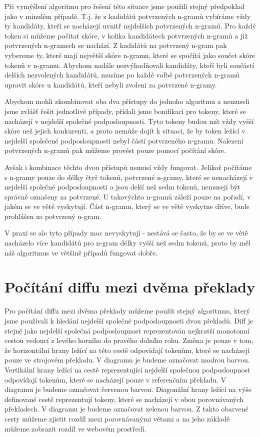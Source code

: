 Při vymýšlení algoritmu pro řešení této situace jsme použili stejný předpoklad jako v minulém případě.
T.j. že z kadidátů potvrzených n-gramů vybíráme vždy ty kandidáty,
  kteří se nacházejí uvnitř nejdelších potvrzených n-gramů.
Pro každý token si můžeme počítat skóre,
  v kolika kandidátech potvrzených n-gramů a již potvrzených n-gramech se nachází.
Z kadidátů na potvrzený n-gram pak vybereme ty,
  které mají největší skóre n-gramu,
  které se spočítá jako součet skóre tokenů v n-gramu.
Abychom nadále nezvýhodňovali kandidáty,
  kteří byli součástí delších nezvolených kandidátů,
  musíme po každé volbě potvrzených n-gramů upravit skóre u kandidátů,
  kteří nebyli zvoleni za potvrzené n-gramy.
  
Abychom mohli zkombinovat oba dva přístupy do jednoho algoritmu a
  nemuseli jsme zvlášť řešit jednotlivé případy,
  přidali jsme bonifikaci pro tokeny,
  které se nacházejí v nejdelší společné podposloupnosti.
Tyto tokeny budou mít vždy vyšší skóre než jejich konkurenti,
  a proto nemůže dojít k situaci,
  že by token ležící v nejdelší společené podposloupnosti nebyl částí potvrzeného n-gramu.
Nalezení potvrzených n-gramů pak můžeme provést pouze pomocí počítání skóre.


Avšak i kombinace těchto dvou přístupů nemusí vždy fungovat.
Jelikož počítáme s n-gramy pouze do délky čtyř tokenů,
  potvrzené n-gramy,
  které se nenacházejí v nejdelší společné podposloupnosti a jsou delší než sedm tokenů,
  nemusejí být správně označeny za potvrzené.
U takovýchto n-gramů záleží pouze na pořadí, v jakém se ve větě vyskytují.
Část n-gramu,
  který se ve větě vyskytne dříve,
  bude prohlášen za potvrzený n-gram.

V praxi se ale tyto případy moc nevyskytují -
  nestává se často, že by se ve větě nacházelo více kandidátů pro n-gram délky vyšší než sedm tokenů,
  proto by měl náš algoritmus ve většině případů fungovat dobře.


\section{Počítání diffu mezi dvěma překlady}
Pro počítání diffu mezi dvěma překlady můžeme použít stejný algoritmus,
  který jsme používali k hledání nejdelší společné podposloupnosti dvou překladů.
Diff je stejně jako nejdelší společná podposloupnost reprezentován nejkratší monotonní cestou vedoucí z levého horního do pravého dolního rohu.
Změna je pouze v tom, že horizontální hrany ležící na této cestě odpovídají tokenům,
  které se nacházejí pouze ve strojovém překladu.
V diagramu je budeme označovat modrou barvou.
Vertikální hrany ležící na cestě reprezentující nejdelší společnou podposloupnost odpovídají tokenům,
  které se nacházejí pouze v referenčním překladu.
V diagramu je budeme označovat červenou barvou.
Diagonální hrany ležící na výše definované cestě reprezentují tokeny,
  které se nacházejí v obou porovnávaných překladech.
V diagramu je budeme označovat zelenou barvou.
Z takto obarvené cesty můžeme zjistit rozdíl mezi porovnávanými větami
  a na jeho základě můžeme zobrazit rozdíl ve webovém prostředí.

